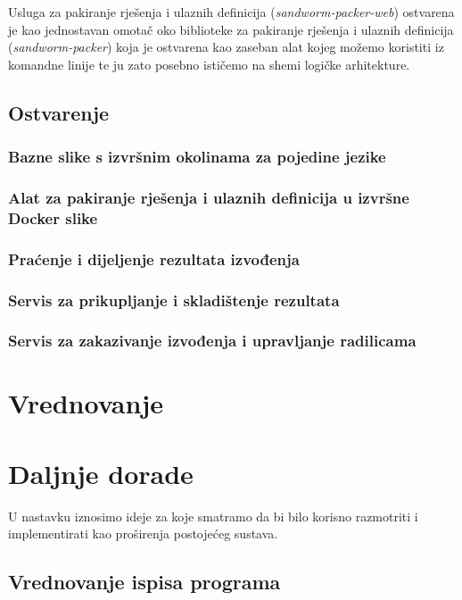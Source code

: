 \documentclass[times, utf8, zavrsni]{fer}
\begin{document}
Usluga za pakiranje rješenja i ulaznih definicija ({\textit{sandworm-packer-web}}) ostvarena je kao jednostavan omotač oko biblioteke za pakiranje rješenja i ulaznih definicija ({\textit{sandworm-packer}}) koja je ostvarena kao zaseban alat kojeg možemo koristiti iz komandne linije te ju zato posebno ističemo na shemi logičke arhitekture.


\section{Ostvarenje}

\subsection{Bazne slike s izvršnim okolinama za pojedine jezike}

\subsection{Alat za pakiranje rješenja i ulaznih definicija u izvršne Docker slike}

\subsection{Praćenje i dijeljenje rezultata izvođenja}

\subsection{Servis za prikupljanje i skladištenje rezultata}

\subsection{Servis za zakazivanje izvođenja i upravljanje radilicama}

\chapter{Vrednovanje}

\chapter{Daljnje dorade}

U nastavku iznosimo ideje za koje smatramo da bi bilo korisno razmotriti i implementirati kao proširenja postojećeg sustava.

\section{Vrednovanje ispisa programa}
\end{document}
